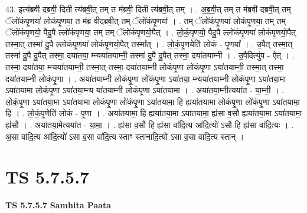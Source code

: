 \documentclass[17pt]{extarticle}
\begin{document}
43. इत्य॑ब्रवी दब्रवी॒ दिती त्य॑ब्रवी॒त् तम् त म॑ब्रवी॒ दिती त्य॑ब्रवी॒त् तम् । . अ॒ब्र॒वी॒त् तम् त म॑ब्रवी दब्रवी॒त् तम् ॅलो॑कंपृ॒णया॑ लोकंपृ॒णया॒ त म॑ब्र वीदब्रवी॒त् तम् ॅलो॑कंपृ॒णया᳚ । . तम् ॅलो॑कंपृ॒णया॑ लोकंपृ॒णया॒ तम् तम् ॅलो॑कंपृ॒णयो॒ पैदु॒पै ल्लो॑कंपृ॒णया॒ तम् तम् ॅलो॑कंपृ॒णयो॒पैत् । . लो॒कं॒पृ॒णयो॒ पैदु॒पै ल्लो॑कंपृ॒णया॑ लोकंपृ॒णयो॒पैत् तस्मा॒त् तस्मा॑ दु॒पै ल्लो॑कंपृ॒णया॑ लोकंपृ॒णयो॒पैत् तस्मा᳚त् । . लो॒कं॒पृ॒णयेति॑ लोकं - पृ॒णया᳚ । . उ॒पैत् तस्मा॒त् तस्मा॑ दु॒पै दु॒पैत् तस्मा॒ दया॑तया॒ म्न्यया॑तयाम्नी॒ तस्मा॑ दु॒पै दु॒पैत् तस्मा॒ दया॑तयाम्नी । . उ॒पैदित्यु॑प - ऐत् । . तस्मा॒ दया॑तया॒ म्न्यया॑तयाम्नी॒ तस्मा॒त् तस्मा॒ दया॑तयाम्नी लोकंपृ॒णा लो॑कंपृ॒णा ऽया॑तयाम्नी॒ तस्मा॒त् तस्मा॒ दया॑तयाम्नी लोकंपृ॒णा । . अया॑तयाम्नी लोकंपृ॒णा लो॑कंपृ॒णा ऽया॑तया॒ म्न्यया॑तयाम्नी लोकंपृ॒णा ऽया॑तया॒मा ऽया॑तयामा लोकंपृ॒णा ऽया॑तया॒म्न्य या॑तयाम्नी लोकंपृ॒णा ऽया॑तयामा । . अया॑तया॒म्नीत्यया॑त - या॒म्नी॒ । . लो॒कं॒पृ॒णा ऽया॑तया॒मा ऽया॑तयामा लोकंपृ॒णा लो॑कंपृ॒णा ऽया॑तयामा॒ हि ह्यया॑तयामा लोकंपृ॒णा लो॑कंपृ॒णा ऽया॑तयामा॒ हि । . लो॒कं॒पृ॒णेति॑ लोकं - पृ॒णा । . अया॑तयामा॒ हि ह्यया॑तया॒मा ऽया॑तयामा॒ ह्य॑सा व॒सौ ह्यया॑तया॒मा ऽया॑तयामा॒ ह्य॑सौ । . अया॑तया॒मेत्यया॑त - या॒मा॒ । . ह्य॑सा व॒सौ हि ह्य॑सा वा॑दि॒त्य आ॑दि॒त्यो॑ ऽसौ हि ह्य॑सा वा॑दि॒त्यः । . अ॒सा वा॑दि॒त्य आ॑दि॒त्यो॑ ऽसा व॒सा वा॑दि॒त्य स्ताꣳ स्ताना॑दि॒त्यो॑ ऽसा व॒सा वा॑दि॒त्य स्तान् । \newline
\pagebreak
{}

\section{ TS 5.7.5.7 }

\textbf{TS 5.7.5.7 } \newline
\textbf{Samhita Paata} \newline
\end{document}
